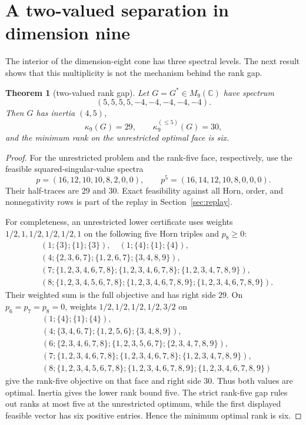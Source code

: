 \documentclass[11pt]{article}
\newtheorem{theorem}{Theorem}[section]
\begin{document}
\section{A two-valued separation in dimension nine}

The interior of the dimension-eight cone has three spectral levels.  The next
result shows that this multiplicity is not the mechanism behind the rank gap.

\begin{theorem}[two-valued rank gap]\label{thm:two-valued}
Let $G=G^*\in M_9(\mathbb C)$ have spectrum
\[
 (5,5,5,5,-4,-4,-4,-4,-4).
\]
Then $G$ has inertia $(4,5)$,
\[
 \kappa_9(G)=29,\qquad \kappa_9^{(\le5)}(G)=30,
\]
and the minimum rank on the unrestricted optimal face is six.
\end{theorem}

\begin{proof}
For the unrestricted problem and the rank-five face, respectively, use the
feasible squared-singular-value spectra
\[
 p=(16,12,10,10,8,2,0,0),\qquad
 p^{5}=(16,14,12,10,8,0,0,0).
\]
Their half-traces are $29$ and $30$.  Exact feasibility against all Horn,
order, and nonnegativity rows is part of the replay in
Section~\ref{sec:replay}.

For completeness, an unrestricted lower certificate uses weights
$1/2,1,1/2,1/2,1/2,1$ on the following five Horn triples and $p_8\ge0$:
\begin{align*}
 &(1;\{3\};\{1\};\{3\}),\quad
 (1;\{4\};\{1\};\{4\}),\\
 &(4;\{2,3,6,7\};\{1,2,6,7\};\{3,4,8,9\}),\\
 &(7;\{1,2,3,4,6,7,8\};\{1,2,3,4,6,7,8\};
       \{1,2,3,4,7,8,9\}),\\
 &(8;\{1,2,3,4,5,6,7,8\};\{1,2,3,4,6,7,8,9\};
       \{1,2,3,4,6,7,8,9\}).
\end{align*}
Their weighted sum is the full objective and has right side $29$.
On $p_6=p_7=p_8=0$, weights $1/2,1/2,1/2,1/2,3/2$ on
\begin{align*}
 &(1;\{4\};\{1\};\{4\}),\\
 &(4;\{3,4,6,7\};\{1,2,5,6\};\{3,4,8,9\}),\\
 &(6;\{2,3,4,6,7,8\};\{1,2,3,5,6,7\};\{2,3,4,7,8,9\}),\\
 &(7;\{1,2,3,4,6,7,8\};\{1,2,3,4,6,7,8\};
       \{1,2,3,4,7,8,9\}),\\
 &(8;\{1,2,3,4,5,6,7,8\};\{1,2,3,4,6,7,8,9\};
       \{1,2,3,4,6,7,8,9\})
\end{align*}
give the rank-five objective on that face and right side $30$.  Thus both
values are optimal.  Inertia gives the lower rank bound five.  The strict
rank-five gap rules out ranks at most five at the unrestricted optimum, while
the first displayed feasible vector has six positive entries.  Hence the
minimum optimal rank is six.
\end{proof}
\end{document}
